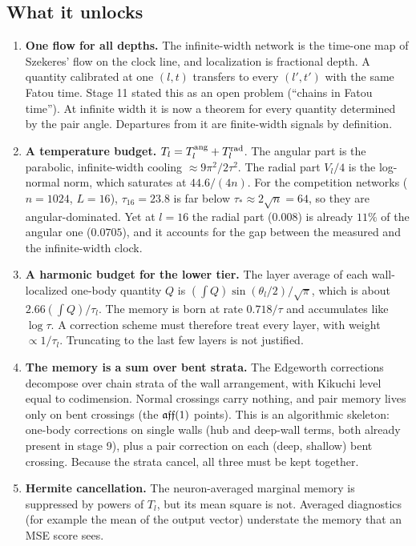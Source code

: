 \subsection{What it unlocks}
\begin{enumerate}[leftmargin=*]
\item \textbf{One flow for all depths.} The infinite-width network is the time-one map of Szekeres' flow on the clock line, and
localization is fractional depth. A quantity calibrated at one $(l,t)$ transfers to every $(l',t')$ with the same Fatou time. Stage 11
stated this as an open problem (``chains in Fatou time''). At infinite width it is now a theorem for every quantity determined by the
pair angle. Departures from it are finite-width signals by definition.
\item \textbf{A temperature budget.} $T_l=T^{\rm ang}_l+T^{\rm rad}_l$. The angular part is the parabolic, infinite-width cooling
$\approx9\pi^2/2\tau^2$. The radial part $V_l/4$ is the log-normal norm, which saturates at $44.6/(4n)$. For the competition
networks ($n=1024$, $L=16$), $\tau_{16}=23.8$ is far below $\tau_*\approx2\sqrt n=64$, so they are angular-dominated. Yet at $l=16$ the
radial part ($0.008$) is already $11\%$ of the angular one ($0.0705$), and it accounts for the gap between the measured and the
infinite-width clock.
\item \textbf{A harmonic budget for the lower tier.} The layer average of each wall-localized one-body quantity $Q$ is $(\int Q)\sin(\theta_l/2)/\sqrt\pi$, which is about $2.66(\int Q)/\tau_l$.
The memory is born at rate $0.718/\tau$ and accumulates like $\log\tau$. A correction scheme must therefore treat every layer, with
weight $\propto1/\tau_l$. Truncating to the last few layers is not justified.
\item \textbf{The memory is a sum over bent strata.} The Edgeworth corrections decompose over chain strata of the wall arrangement,
with Kikuchi level equal to codimension. Normal crossings carry nothing, and pair memory lives only on bent crossings (the $\mathfrak{aff}(1)$
points). This is an algorithmic skeleton: one-body corrections on single walls (hub and deep-wall terms, both already present in
stage 9), plus a pair correction on each (deep, shallow) bent crossing. Because the strata cancel, all three must be kept together.
\item \textbf{Hermite cancellation.} The neuron-averaged marginal memory is suppressed by powers of $T_l$, but its mean square is not.
Averaged diagnostics (for example the mean of the output vector) understate the memory that an MSE score sees.

\end{enumerate}
